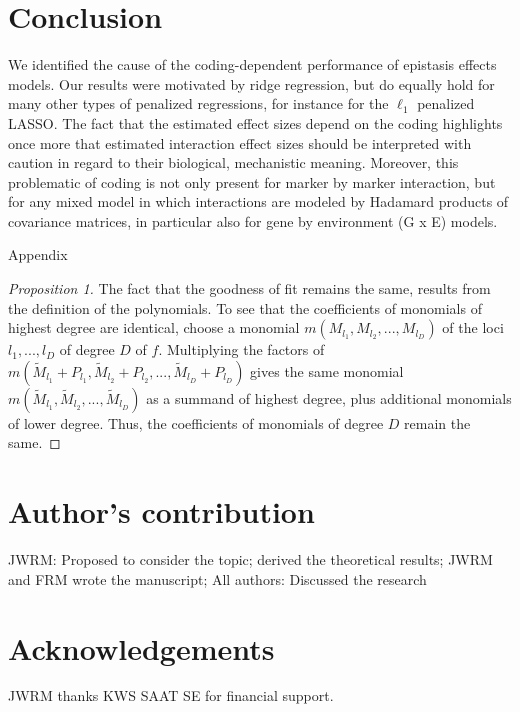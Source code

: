 \documentclass{bmcart}
\newcommand{\0}{\mathbf{0}}
\begin{document}
\section*{Conclusion}
We identified the cause of the coding-dependent performance of epistasis effects models. Our results were motivated by ridge regression, but do equally hold for many other types of penalized regressions, for instance for the $\ell_1$ penalized LASSO. The fact that the estimated effect sizes depend on the coding highlights once more that estimated interaction effect sizes should be interpreted with caution in regard to their biological, mechanistic meaning. Moreover, this problematic of coding is not only present for marker by marker interaction, but for any mixed model in which interactions are modeled by Hadamard products of covariance matrices, in particular also for gene by environment (G x E) models.



\newpage
\begin{center} {\huge Appendix } \end{center}
\vspace{0.5cm}
\begin{proof}[Proposition 1]
	The fact that the goodness of fit remains the same, results from the definition of the polynomials. To see that the coefficients of monomials of highest degree are identical, choose a monomial $m(M_{l_1},M_{l_2},...,M_{l_D})$ of the loci $l_1,...,l_D$ of degree $D$ of $f$. Multiplying the factors of $m(\tilde{M}_{l_1}+P_{l_1},\tilde{M}_{l_2}+P_{l_2},...,\tilde{M}_{l_D}+P_{l_D})$ gives the same monomial 
	$m(\tilde{M}_{l_1},\tilde{M}_{l_2},...,\tilde{M}_{l_D})$ as a summand of highest degree, plus additional monomials of lower degree. Thus, the coefficients of monomials of degree $D$ remain the same.
\end{proof}
\section*{Author's contribution}
JWRM: Proposed to consider the topic; derived the theoretical results; JWRM and FRM wrote the manuscript;
All authors: Discussed the research



\section*{Acknowledgements}
JWRM thanks KWS SAAT SE for financial support.
\end{document}

